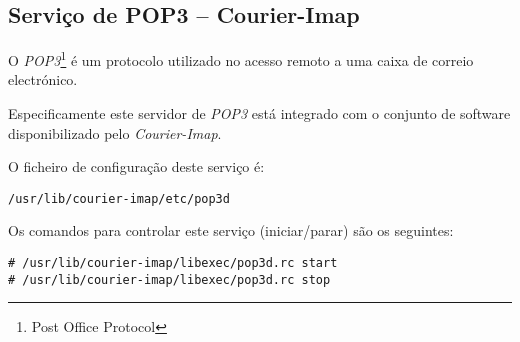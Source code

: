 \subsection{Serviço de POP3 -- Courier-Imap}

O \emph{POP3}\footnote{Post Office Protocol} é um protocolo utilizado no acesso
remoto a uma caixa de correio electrónico.

Especificamente este servidor de \emph{POP3} está integrado com o conjunto de
software disponibilizado pelo \emph{Courier-Imap}.

O ficheiro de configuração deste serviço é:

\begin{Verbatim}[commandchars=\\\{\}]
/usr/lib/courier-imap/etc/pop3d
\end{Verbatim}

Os comandos para controlar este serviço (iniciar/parar) são os seguintes:

\begin{Verbatim}[commandchars=\\\{\}]
# /usr/lib/courier-imap/libexec/pop3d.rc start
# /usr/lib/courier-imap/libexec/pop3d.rc stop
\end{Verbatim}

